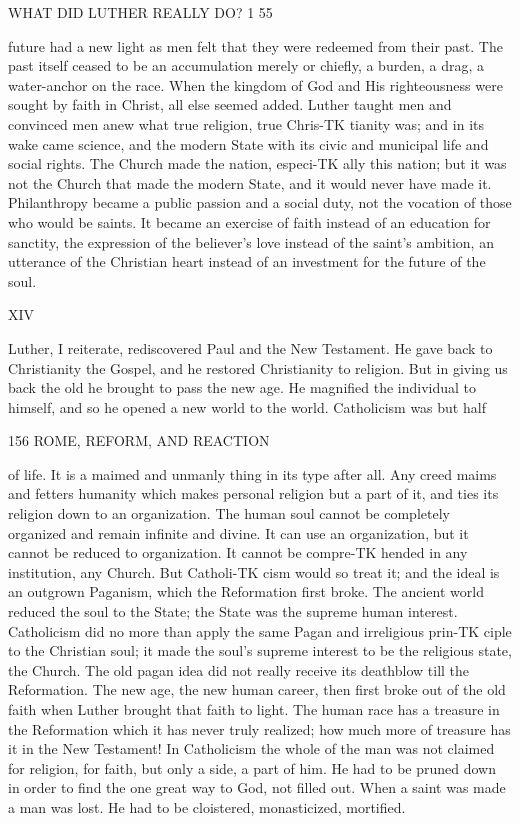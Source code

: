 \documentclass[12pt,a5paper,oneside]{book}
\begin{document}
{WHAT DID LUTHER REALLY DO? 1 55 

future had a new light as men felt that they were 
redeemed from their past. The past itself ceased to 
be an accumulation merely or chiefly, a burden, a drag, 
a water-anchor on the race. When the kingdom of 
God and His righteousness were sought by faith in 
Christ, all else seemed added. Luther taught men and 
convinced men anew what true religion, true Chris-TK
tianity was; and in its wake came science, and the 
modern State with its civic and municipal life and 
social rights. The Church made the nation, especi-TK
ally this nation; but it was not the Church that made 
the modern State, and it would never have made it. 
Philanthropy became a public passion and a social 
duty, not the vocation of those who would be saints. 
It became an exercise of faith instead of an education 
for sanctity, the expression of the believer's love 
instead of the saint's ambition, an utterance of the 
Christian heart instead of an investment for the future 
of the soul. 

XIV 

Luther, I reiterate, rediscovered Paul and the New 
Testament. He gave back to Christianity the Gospel, 
and he restored Christianity to religion. But in giving 
us back the old he brought to pass the new age. He 
magnified the individual to himself, and so he opened 
a new world to the world. Catholicism was but half 



156 ROME, REFORM, AND REACTION 

of life. It is a maimed and unmanly thing in its type 
after all. Any creed maims and fetters humanity 
which makes personal religion but a part of it, and ties 
its religion down to an organization. The human soul 
cannot be completely organized and remain infinite 
and divine. It can use an organization, but it cannot 
be reduced to organization. It cannot be compre-TK
hended in any institution, any Church. But Catholi-TK
cism would so treat it; and the ideal is an outgrown 
Paganism, which the Reformation first broke. The 
ancient world reduced the soul to the State; the State 
was the supreme human interest. Catholicism did no 
more than apply the same Pagan and irreligious prin-TK
ciple to the Christian soul; it made the soul's supreme 
interest to be the religious state, the Church. The 
old pagan idea did not really receive its deathblow till 
the Reformation. The new age, the new human 
career, then first broke out of the old faith when 
Luther brought that faith to light. The human race 
has a treasure in the Reformation which it has never 
truly realized; how much more of treasure has it in 
the New Testament! In Catholicism the whole of 
the man was not claimed for religion, for faith, but 
only a side, a part of him. He had to be pruned 
down in order to find the one great way to God, not 
filled out. When a saint was made a man was lost. 
He had to be cloistered, monasticized, mortified. 



}
\end{document}
